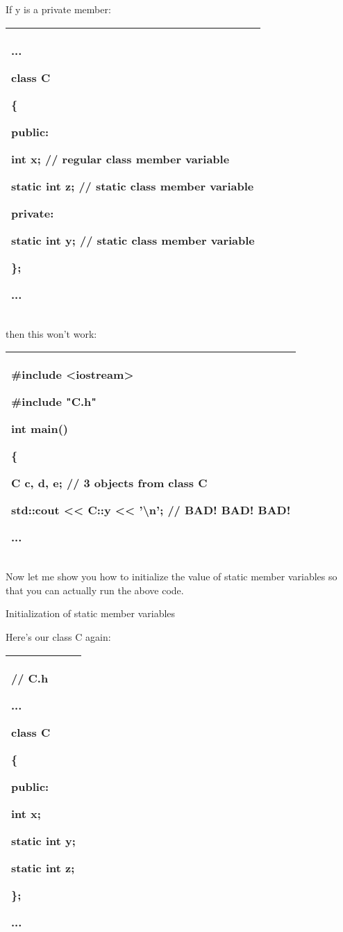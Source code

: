 \documentclass[
]{article}
\begin{document}
If y is a private member:

\begin{longtable}[]{@{}l@{}}
\toprule
\endhead
\begin{minipage}[t]{0.97\columnwidth}\raggedright
...

class C

\{

public:

int x; // regular class member variable

static int z; // static class member variable

private:

static int y; // static class member variable

\};

...\strut
\end{minipage}\tabularnewline
\bottomrule
\end{longtable}

then this won't work:

\begin{longtable}[]{@{}l@{}}
\toprule
\endhead
\begin{minipage}[t]{0.97\columnwidth}\raggedright
\#include \textless iostream\textgreater{}

\#include "C.h"

int main()

\{

C c, d, e; // 3 objects from class C

std::cout \textless\textless{} C::y \textless\textless{}
'\textbackslash n'; // BAD! BAD! BAD!

...\strut
\end{minipage}\tabularnewline
\bottomrule
\end{longtable}

Now let me show you how to initialize the value of static member
variables so that you can actually run the above code.

Initialization of static member variables

Here's our class C again:

\begin{longtable}[]{@{}l@{}}
\toprule
\endhead
\begin{minipage}[t]{0.97\columnwidth}\raggedright
// C.h

...

class C

\{

public:

int x;

static int y;

static int z;

\};

...\strut
\end{minipage}\tabularnewline
\bottomrule
\end{longtable}
\end{document}
